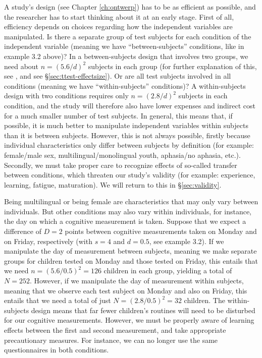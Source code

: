 \documentclass[
]{book}
\begin{document}
A study's design (see Chapter \ref{ch:ontwerp}) has to be as efficient as possible, and the researcher has to start thinking about it at an early stage. First of all, efficiency depends on choices regarding how the independent variables are manipulated. Is there a separate group of test subjects for each condition of the independent variable (meaning we have ``between-subjects'' conditions, like in example 3.2 above)? In a between-subjects design that involves two groups, we need about \(n = (5.6/d)^2\) subjects in each group (for further explanation of this, see \citet{Gelm07}, and see §\ref{sec:ttest-effectsize}). Or are all test subjects involved in all conditions (meaning we have ``within-subjects'' conditions)? A within-subjects design with two conditions requires only \(n = (2.8/d)^2\) subjects in each condition, and the study will therefore also have lower expenses and indirect cost for a much smaller number of test subjects. In general, this means that, if possible, it is much better to manipulate independent variables within subjects than it is between subjects. However, this is not always possible, firstly because individual characteristics only differ between subjects by definition (for example: female/male sex, multilingual/monolingual youth, aphasia/no aphasia, etc.). Secondly, we must take proper care to recognize effects of so-called transfer between conditions, which threaten our study's validity (for example: experience, learning, fatigue, maturation). We will return to this in §\ref{sec:validity}.

Being multilingual or being female are characteristics that may only vary between individuals. But other conditions may also vary within individuals, for instance, the day on which a cognitive measurement is taken. Suppose that we expect a difference of \(D = 2\) points between cognitive measurements taken on Monday and on Friday, respectively (with \(s = 4\) and \(d = 0.5\), see example 3.2). If we manipulate the day of measurement between subjects, meaning we make separate groups for children tested on Monday and those tested on Friday, this entails that we need \(n = (5.6/0.5)^2 = 126\) children in each group, yielding a total of \(N = 252\). However, if we manipulate the day of measurement within subjects, meaning that we observe each test subject on Monday and also on Friday, this entails that we need a total of just \(N = (2.8/0.5)^2 = 32\) children. The within-subjects design means that far fewer children's routines will need to be disturbed for our cognitive measurements. However, we must be properly aware of learning effects between the first and second measurement, and take appropriate precautionary measures. For instance, we can no longer use the same questionnaires in both conditions.
\end{document}
